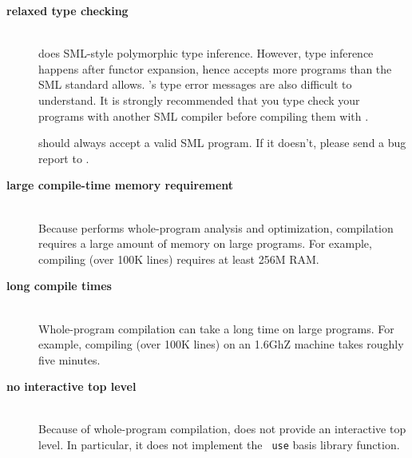 
\newcommand{\drawback}[1]{\item[\bf #1]\hspace{1in}\\}

\begin{description}

\drawback{relaxed type checking}
{\mlton} does SML-style polymorphic type inference.  However, type
inference happens after functor expansion, hence {\mlton} accepts more
programs than the SML standard allows.  {\mlton}'s type error messages
are also difficult to understand.  It is strongly recommended that you
type check your programs with another SML compiler before compiling
them with {\mlton}.

{\mlton} should always accept a valid SML program.  If it doesn't,
please send a bug report to {\mltonmail}.

\drawback{large compile-time memory requirement}
Because {\mlton} performs whole-program analysis and optimization,
compilation requires a large amount of memory on large programs.  For
example, compiling {\mlton} (over 100K lines) requires at least 256M
RAM.

\drawback{long compile times}
Whole-program compilation can take a long time on large programs.  For
example, compiling {\mlton} (over 100K lines) on an 1.6GhZ machine
takes roughly five minutes.

\drawback{no interactive top level}
Because of whole-program compilation, {\mlton} does not provide an
interactive top level.  In particular, it does not implement the {\tt
use} basis library function.

\end{description}
